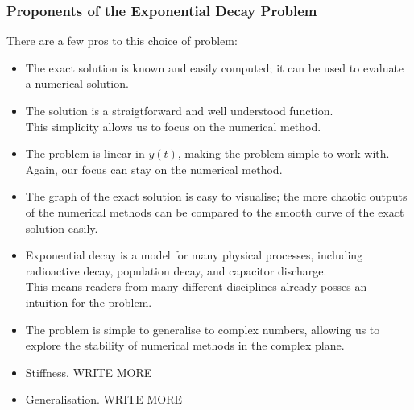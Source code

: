 \subsubsection{Proponents of the Exponential Decay Problem}
\par There are a few pros to this choice of problem:
\begin{itemize}
    \item The exact solution is known and easily computed; it can be used to evaluate a numerical solution.
    \item The solution is a straigtforward and well understood function.\\
    	  This simplicity allows us to focus on the numerical method.
    \item The problem is linear in $y(t)$, making the problem simple to work with.\\
    	  Again, our focus can stay on the numerical method.
    \item The graph of the exact solution is easy to visualise; the more chaotic outputs of the numerical methods can be compared to the smooth curve of the exact solution easily.
    \item Exponential decay is a model for many physical processes, including radioactive decay, population decay, and capacitor discharge.\\
    	  This means readers from many different disciplines already posses an intuition for the problem.
    \item The problem is simple to generalise to complex numbers, allowing us to explore the stability of numerical methods in the complex plane.
    \item Stiffness. WRITE MORE
    \item Generalisation. WRITE MORE
\end{itemize}

